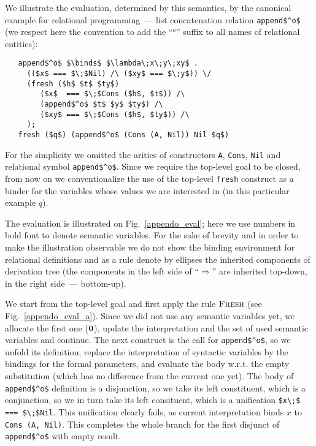 We illustrate the evaluation, determined by this semantics, by the canonical example for relational programming~--- list concatenation relation \lstinline|append$^o$| 
(we respect here the convention to add the ``$^o$'' suffix to all names of relational entities):

\begin{lstlisting}  
   append$^o$ $\binds$ $\lambda\;x\;y\;xy$ . 
     (($x$ === $\;$Nil) /\ ($xy$ === $\;y$)) \/
     (fresh ($h$ $t$ $ty$)
        ($x$  === $\;$Cons ($h$, $t$)) /\
        (append$^o$ $t$ $y$ $ty$) /\
        ($xy$ === $\;$Cons ($h$, $ty$)) /\
     );
   fresh ($q$) (append$^o$ (Cons (A, Nil)) Nil $q$)
\end{lstlisting}

For the simplicity we omitted the arities of constructors \lstinline|A|, \lstinline|Cons|, \lstinline|Nil| and relational symbol \lstinline|append$^o$|. Since we require the 
top-level goal to be closed, from now on we conventionalize the use of the top-level \lstinline|fresh| construct as a binder for the variables whose values we are 
interested in (in this particular example $q$).

The evaluation is illustrated on Fig.~\ref{appendo_eval}; here we use numbers in bold font to denote semantic variables. For the sake of brevity and in order to
make the illustration observable we do not show the binding environment for relational definitions and as a rule denote by ellipses the inherited components
of derivation tree (the components in the left side of ``$\Rightarrow$'' are inherited top-down, in the right side~--- bottom-up).

We start from the top-level goal and first apply the rule $\textsc{Fresh}$ (see Fig.~\ref{appendo_eval_a}). Since 
we did not use any semantic variables yet, we allocate the first one ($\mbox{\textbf{0}}$), update the interpretation and the set of used semantic variables and continue. The next construct
is the call for \lstinline|append$^o$|, so we unfold its definition, replace the interpretation of syntactic variables by the bindings for the formal parameters, and 
evaluate the body w.r.t. the empty substitution (which has no difference from the current one yet). The body of \lstinline|append$^o$| definition is a disjunction, so we
take its left constituent, which is a conjunction, so we in turn take its left consituent, which is a unification \lstinline|$x\;$ === $\;$Nil|. This unification clearly fails, as
current interpretation binds $x$ to \lstinline|Cons (A, Nil)|. This completes the whole branch for the first disjunct of \lstinline|append$^o$| with empty result.

